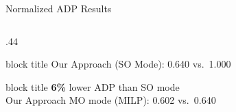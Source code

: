 \documentclass[aspectratio=169,10pt]{beamer}
\begin{document}
\begin{frame}[label=summary-12]{Normalized ADP Results}
\begin{columns}[T,onlytextwidth]
\begin{column}{.44\textwidth}
\begin{beamercolorbox}[rounded=true,sep=.10cm,wd=\linewidth]{block title}
        {\scriptsize\color{Muted}Our Approach (SO Mode): 0.640 vs.\ 1.000}
      \end{beamercolorbox}
      \vspace{.06cm}
      \begin{beamercolorbox}[rounded=true,sep=.10cm,wd=\linewidth]{block title}
        {\fontsize{18}{20}\selectfont\bfseries\color{Accent}6\%}\quad
        {\footnotesize\color{Ink}lower ADP than SO mode}\\[1pt]
        {\scriptsize\color{Muted}Our Approach MO mode (MILP): 0.602 vs.\ 0.640}
      \end{beamercolorbox}
    \end{column}
  \end{columns}
\end{frame}
\end{document}

